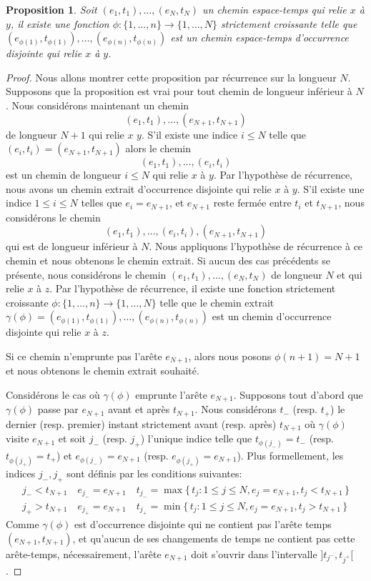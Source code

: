 \documentclass[titlepage,a4paper,12pt]{article}
\newcounter{d}
\newcounter{t}
\newcounter{p}
\newcounter{c}
\newcounter{a}
\newcounter{l}
\newtheorem{prop}[p]{Proposition}
\begin{document}
\begin{prop}
Soit $(e_1,t_1),\dots,(e_N,t_N)$ un chemin espace-temps qui relie $x$ à $y$, il existe une fonction $\phi: \{1,\dots, n\}\rightarrow \{1,\dots, N\}$ strictement croissante telle que $(e_{\phi(1)},t_{\phi(1)}),\dots,(e_{\phi(n)},t_{\phi(n)})$ est un chemin espace-temps d'occurrence disjointe qui relie $x$ à $y$.
\end{prop}
\begin{proof}
Nous allons montrer cette proposition par récurrence sur la longueur $N$. Supposons que la proposition est vrai pour tout chemin de longueur inférieur à $N$. Nous considérons maintenant un chemin $$(e_1,t_1),\dots, (e_{N+1},t_{N+1})$$ de longueur $N+1$ qui relie $x$ $y$. S'il existe une indice $i\leqslant N$ telle que $(e_i,t_i) = (e_{N+1},t_{N+1})$ alors le chemin $$(e_1,t_1),\dots,(e_i,t_i)
$$ est un chemin de longueur $i\leqslant N$ qui relie $x$ à $y$. Par l'hypothèse de récurrence, nous avons un chemin extrait d'occurrence disjointe qui relie $x$ à $y$. 
S'il existe une indice $1\leqslant i\leqslant N$ telles que $e_i = e_{N+1}$, et $e_{N+1}$ reste fermée entre $t_i$ et $t_{N+1}$, nous considérons le chemin $$(e_1,t_1), \dots, (e_{i},t_{i}), (e_{N+1},t_{N+1})$$ qui est de longueur inférieur à $N$. Nous appliquons l'hypothèse de récurrence à ce chemin et nous obtenons le chemin extrait. Si aucun des cas précédents se présente, nous considérons le chemin $(e_1,t_1),\dots,(e_N,t_N)$ de longueur $N$ et qui relie $x$ à $z$. Par l'hypothèse de récurrence, il existe une fonction strictement croissante $\phi:\{1,\dots,n\}\rightarrow \{1,\dots, N\}$ telle que le chemin extrait $\gamma(\phi) = (e_{\phi(1)},t_{\phi(1)}),\dots,(e_{\phi(n)},t_{\phi(n)})$ est un chemin d'occurrence disjointe qui relie $x$ à $z$. 

Si ce chemin n'emprunte pas l'arête $e_{N+1}$, alors nous posons $\phi(n+1) = N+1$ et nous obtenons le chemin extrait souhaité.

Considérons le cas où $\gamma(\phi)$ emprunte l'arête $e_{N+1}$. Supposons tout d'abord que $\gamma(\phi)$ passe par $e_{N+1}$ avant et après $t_{N+1}$. Nous considérons $t_-$ (resp. $t_+$) le dernier (resp. premier) instant strictement avant (resp. après) $t_{N+1}$ où $\gamma(\phi)$ visite $e_{N+1}$ et soit $j_-$ (resp. $j_+$) l'unique indice telle que $t_{\phi(j_-)}= t_-$ (resp. $t_{\phi(j_+)}= t_+$) et $e_{\phi(j_-)}= e_{N+1}$ (resp. $e_{\phi(j_+)}= e_{N+1}$). Plus formellement, les indices $j_-,j_+$ sont définis par les conditions suivantes:
\begin{align*}
{j_-}< t_{N+1}\quad e_{j_-} = e_{N+1}\quad t_{j_-} = \max \big\{\,t_j:1\leqslant j \leqslant N, e_j = e_{N+1}, t_j < t_{N+1}\,\big\}\\
{j_+}> t_{N+1}\quad e_{j_+} = e_{N+1}\quad t_{j_+} = \min \big\{\,t_j:1\leqslant j \leqslant N, e_j = e_{N+1}, t_j > t_{N+1}\,\big\}
\end{align*}
Comme $\gamma(\phi)$ est d'occurrence disjointe qui ne contient pas l'arête temps $(e_{N+1},t_{N+1})$, et qu'aucun de ses changements de temps ne contient pas cette arête-temps, nécessairement, l'arête $e_{N+1}$ doit s'ouvrir dans l'intervalle $]t_{j^-},t_{j^+}[$.


\end{proof}
\end{document}

